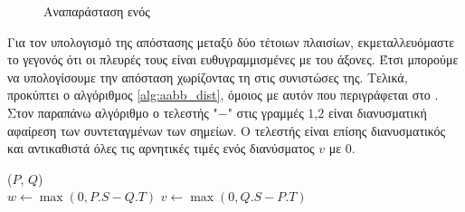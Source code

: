 \begin{figure}[h]
    \centering
    
    \newcommand{\Depth}{2}
    \newcommand{\Height}{2}
    \newcommand{\Width}{3}
    \caption[Αναπαράσταση ενός ]{Αναπαράσταση ενός }
\end{figure}


Για τον υπολογισμό της απόστασης μεταξύ δύο τέτοιων πλαισίων, 
εκμεταλλευόμαστε το γεγονός ότι οι πλευρές τους είναι ευθυγραμμισμένες
με του άξονες.
Έτσι μπορούμε να υπολογίσουμε την απόσταση χωρίζοντας τη στις συνιστώσες της.
Τελικά, προκύπτει ο αλγόριθμος \ref{alg:aabb_dist}, 
όμοιος με αυτόν που περιγράφεται στο \cite{krishnamurthy2011gpu}.
Στον παραπάνω αλγόριθμο  ο τελεστής "$-$" στις γραμμές 
$1$,$2$ είναι διανυσματική αφαίρεση των συντεταγμένων των σημείων.
Ο τελεστής  είναι επίσης διανυσματικός και
αντικαθιστά όλες τις αρνητικές τιμές ενός διανύσματος $v$
με $0$.

\IncMargin{1.5em}
\begin{algorithm}[h]
    \DontPrintSemicolon
    \Indm\nonl\funcname($P$, $Q$)\\
    \Indp
        $w \gets \max(0, P.S - Q.T)$\;
        $v \gets \max(0, Q.S - P.T)$\;

    \caption[Υπολογισμός Απόστασης δύο ]{
    }
    \label{alg:aabb_dist}
\end{algorithm}
\DecMargin{1.5em}

